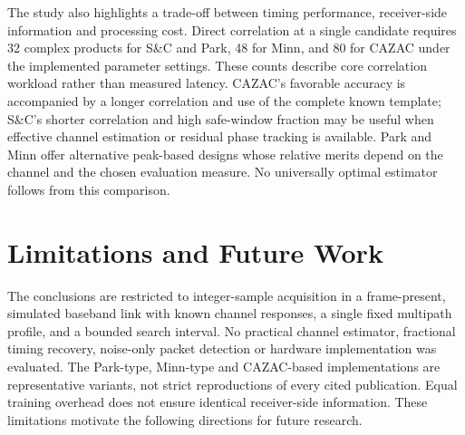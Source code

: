 The study also highlights a trade-off between timing performance,
receiver-side information and processing cost. Direct correlation at a
single candidate requires 32 complex products for S\&C and Park, 48
for Minn, and 80 for CAZAC under the implemented parameter settings.
These counts describe core correlation workload rather than measured
latency. CAZAC's favorable accuracy is accompanied by a longer correlation
and use of the complete known template; S\&C's shorter correlation and
high safe-window fraction may be useful when effective channel estimation
or residual phase tracking is available. Park and Minn offer alternative
peak-based designs whose relative merits depend on the channel and the
chosen evaluation measure. No universally optimal estimator follows from
this comparison.

\section{Limitations and Future Work}

The conclusions are restricted to integer-sample acquisition in a
frame-present, simulated baseband link with known channel responses,
a single fixed multipath profile, and a bounded search interval. No
practical channel estimator, fractional timing recovery, noise-only
packet detection or hardware implementation was evaluated. The Park-type,
Minn-type and CAZAC-based implementations are representative variants,
not strict reproductions of every cited publication. Equal training
overhead does not ensure identical receiver-side information. These
limitations motivate the following directions for future research.

